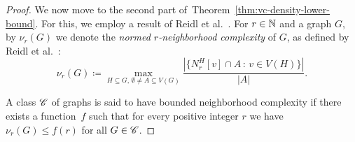 \begin{proof}
\medskip
We now move to the  second part of~Theorem~\ref{thm:vc-density-lower-bound}. For this, we employ a result of Reidl et al.~\cite{reidl2016characterising}. 
%
%
%
%
%
For $r\in \mathbb{N}$ and a graph $G$, by $\nu_r(G)$ we denote the
\emph{normed $r$-neighborhood complexity} of $G$, as defined
by Reidl et al.~\cite{reidl2016characterising}: 
\begin{equation*}
\nu_r(G)\coloneqq\max_{H\subseteq G,\,\emptyset\neq A\subseteq V(G)}\frac{|\{N_r^H[v]\cap A\, \colon\, v\in V(H)\}|}{|A|}.
\end{equation*}

A class $\mathscr{C}$ of graphs is said to have bounded neighborhood 
complexity if there exists a function~$f$ such that
for every positive integer $r$ we have $\nu_r(G)\leq f(r)$
for all $G\in\mathscr{C}$. 




\end{proof}
